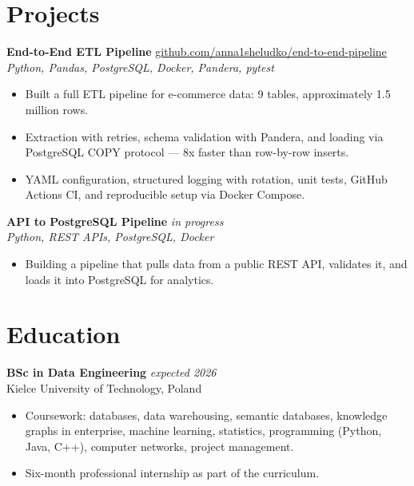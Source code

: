 \documentclass[10pt,a4paper]{article}
\begin{document}
\section{Projects}

\textbf{End-to-End ETL Pipeline} \hfill
\href{https://github.com/anna1sheludko/end-to-end-pipeline}{github.com/anna1sheludko/end-to-end-pipeline}\\
\textit{Python, Pandas, PostgreSQL, Docker, Pandera, pytest}
\begin{itemize}
  \item Built a full ETL pipeline for e-commerce data: 9 tables, approximately
        1.5 million rows.
  \item Extraction with retries, schema validation with Pandera, and loading
        via PostgreSQL COPY protocol --- 8x faster than row-by-row inserts.
  \item YAML configuration, structured logging with rotation, unit tests,
        GitHub Actions CI, and reproducible setup via Docker Compose.
\end{itemize}

\vspace{0.6em}

\textbf{API to PostgreSQL Pipeline} \hfill \textit{in progress}\\
\textit{Python, REST APIs, PostgreSQL, Docker}
\begin{itemize}
  \item Building a pipeline that pulls data from a public REST API, validates
        it, and loads it into PostgreSQL for analytics.
\end{itemize}

\section{Education}

\textbf{BSc in Data Engineering} \hfill \textit{expected 2026}\\
Kielce University of Technology, Poland
\begin{itemize}
  \item Coursework: databases, data warehousing, semantic databases, knowledge
        graphs in enterprise, machine learning, statistics, programming
        (Python, Java, C++), computer networks, project management.
  \item Six-month professional internship as part of the curriculum.
\end{itemize}
\end{document}
